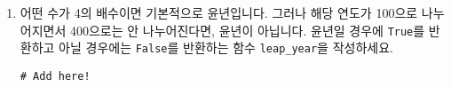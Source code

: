 \documentclass[../main.tex]{subfiles}
\begin{document}
\begin{enumerate}
%
%
%

\item 어떤 수가 4의 배수이면 기본적으로 윤년입니다. 그러나 해당 연도가 100으로
  나누어지면서 400으로는 안 나누어진다면, 윤년이 아닙니다. 윤년일 경우에
  \verb|True|를 반환하고 아닐 경우에는 \verb|False|를 반환하는 함수
  \verb|leap_year|을 작성하세요.
\begin{verbatim}
# Add here!


\end{verbatim}
\end{enumerate}
\end{document}
